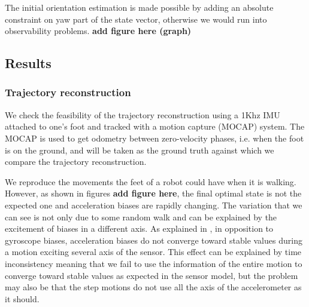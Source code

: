 The initial orientation estimation is made possible by adding an absolute constraint on yaw part of the state vector, otherwise we would run into observability problems. \textbf{add figure here (graph)}

\subsection{Results}
\subsubsection{Trajectory reconstruction}

We check the feasibility of the trajectory reconstruction using a 1Khz IMU attached to one's foot and tracked with a motion capture (MOCAP) system. The MOCAP is used to get odometry between zero-velocity phases, i.e. when the foot is on the ground,
and will be taken as the ground truth against which we compare the trajectory reconstruction.

We reproduce the movements the feet of a robot could have when it is walking. However, as shown in figures \textbf{add figure here}, the final optimal state
is not the expected one and acceleration biases are rapidly changing. The variation that we can see is not only due to some random walk and can be explained by the excitement of biases in a different axis.
As explained in \cite{roussillon2011rt}, in opposition to gyroscope biases, acceleration biases do not converge toward stable values during a motion exciting several axis of the sensor. 
This effect can be explained by time inconsistency meaning that we fail
to use the information of the entire motion to converge toward stable values as expected in the sensor model, but the problem may also be that the step motions do not use all the axis of the accelerometer as it should.

